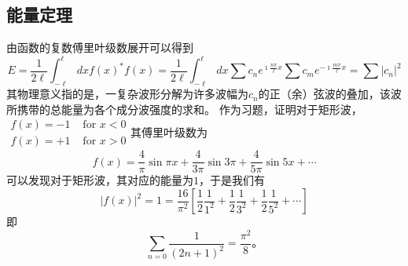 \subsection{能量定理}
由函数的复数傅里叶级数展开可以得到
\begin{equation}
  E = \frac{1}{2\ell} \int_{-\ell}^{\ell} dx f(x)^* f(x) 
 = \frac{1}{2\ell} \int_{-\ell}^{\ell} dx  \sum c_n e^{\imath \frac{n\pi}{\ell} x} \sum c_m e^{-\imath \frac{m\pi}{\ell} x}
 = \sum |c_n|^2
\end{equation}
其物理意义指的是，一复杂波形分解为许多波幅为$c_n$的正（余）弦波的叠加，该波所携带的总能量为各个成分波强度的求和。
作为习题，证明对于矩形波，
$\begin{array}{ll}f(x)=-1 & \text { for } x<0 \\ f(x)=+1 & \text { for } x>0\end{array}$其傅里叶级数为
$$
f(x)=\frac{4}{\pi} \sin \pi x+\frac{4}{3 \pi} \sin 3 \pi+\frac{4}{5 \pi} \sin 5 x+\cdots
$$
可以发现对于矩形波，其对应的能量为$1$，于是我们有
$$
|f(x)|^2=1=\frac{16}{\pi^2}\left[\frac{1}{2} \frac{1}{1^2}+\frac{1}{2} \frac{1}{3^2}+\frac{1}{2} \frac{1}{5^2}+\cdots\right]
$$
即
\[
\sum_{n=0} \frac{1}{(2n+1)^2} = \frac{\pi^2}{8} \textrm{。}
\]